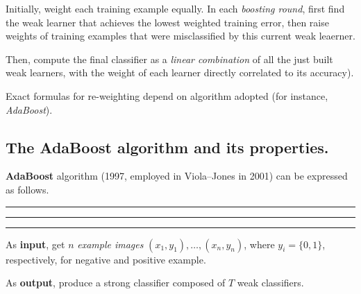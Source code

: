 \documentclass[10pt]{report}
\begin{document}
Initially, weight each training example equally. In each \emph{boosting round}, first find the weak learner that achieves the lowest weighted training error, then raise weights of training examples that were misclassified by this current weak leaerner.

Then, compute the final classifier as a \emph{linear combination} of all the just built weak learners, with the weight of each learner directly correlated to its accuracy).

Exact formulas for re\--weighting depend on algorithm adopted (for instance, \emph{Ada\-Boost}).

\subsection{The AdaBoost algorithm and its properties.}
\label{sec:orgda740e3}
\textbf{AdaBoost} algorithm (1997, employed in Viola\---Jones in 2001) can be expressed as follows.

\vspace*{0.6cm}\hrule
\hrule
\hrule
\vspace*{0.4cm}
As \textbf{input}, get \(n\) \emph{example images} \((x_1, y_1), \dots, (x_n, y_n)\), where \(y_i = \{0, 1\}\), respectively, for negative and positive example.

As \textbf{output}, produce a strong classifier composed of \(T\) weak classifiers.
\end{document}
